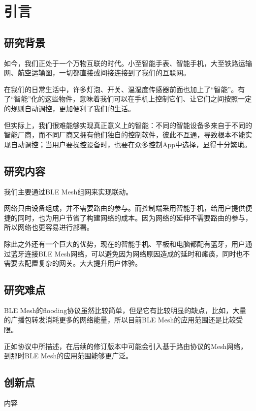 \chapter{引言}

\section{研究背景}
如今，我们正处于一个万物互联的时代。小至智能手表、智能手机，大至铁路运输网、航空运输图，一切都直接或间接连接到了我们的互联网。

在我们的日常生活中，许多灯泡、开关、温湿度传感器前面也加上了“智能”。有了“智能”化的这些物件，意味着我们可以在手机上控制它们、让它们之间按照一定的规则自动调控，更加便利了我们的生活。

但实际上，我们很难能够实现真正意义上的智能：不同的智能设备多来自于不同的智能厂商，而不同厂商又拥有他们独自的控制软件，彼此不互通，导致根本不能实现自动调控；当用户要操控设备时，也要在众多控制App中选择，显得十分繁琐。

\section{研究内容}
我们主要通过BLE Mesh组网来实现联动。

网络只由设备组成，并不需要路由的参与。而控制端采用智能手机，给用户提供便捷的同时，也为用户节省了构建网络的成本。因为网络的延伸不需要路由的参与，所以网络也更容易进行部署。

除此之外还有一个巨大的优势，现在的智能手机、平板和电脑都配有蓝牙，用户通过蓝牙连接BLE Mesh网络，可以避免因为网络原因造成的延时和瘫痪，同时也不需要去配置复杂的网关。大大提升用户体验。

\section{研究难点}
BLE Mesh的flooding协议虽然比较简单，但是它有比较明显的缺点，比如，大量的广播包转发消耗更多的网络能量，所以目前BLE Mesh的应用范围还是比较受限。

正如协议中所描述，在后续的修订版本中可能会引入基于路由协议的Mesh网络，到那时BLE Mesh的应用范围能够更广泛。

\section{创新点}
内容